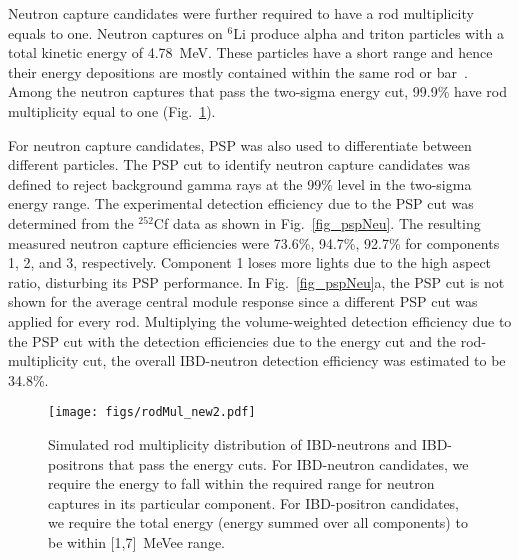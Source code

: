 \documentclass[final,5p,times,twocolumn]{elsarticle}
\begin{document}
Neutron capture candidates were further required to have a rod multiplicity equals to one.
Neutron captures on $^6$Li produce alpha and triton particles with a total kinetic energy of 4.78~MeV. These particles have a short range and hence their energy depositions are mostly contained within the same rod or bar~\cite{SANDD1}. Among the neutron captures that pass the two-sigma energy cut, 99.9\% have rod multiplicity equal to one (Fig.~\ref{fig:gamNeuMul}).

For neutron capture candidates, PSP was also used to differentiate between different particles. The PSP cut to identify neutron capture candidates was defined to reject background gamma rays at the 99\% level in the two-sigma energy range. 
The experimental detection efficiency due to the PSP cut was determined from the $^{252}$Cf data as shown in Fig.~\ref{fig_pspNeu}. The resulting measured neutron capture efficiencies were 73.6\%, 94.7\%, 92.7\% for components 1, 2, and 3, respectively.
Component 1 loses more lights due to the high aspect ratio, disturbing its PSP performance. 
In Fig.~\ref{fig_pspNeu}a, the PSP cut is not shown for the average central module response since a different PSP cut was applied for every rod. Multiplying the volume-weighted detection efficiency due to the PSP cut with the detection efficiencies due to the energy cut and the rod-multiplicity cut, the overall IBD-neutron detection efficiency was estimated to be
34.8\%.

\begin{figure}[ht]
\centering\texttt{[image: figs/rodMul\_new2.pdf]}
\caption{Simulated rod multiplicity distribution of IBD-neutrons and IBD-positrons that pass the energy cuts. For IBD-neutron candidates, we require the energy to fall within the required range for neutron captures in its particular component. For IBD-positron candidates, we require the total energy (energy summed over all components) to be within [1,7]~MeVee range.}
\label{fig:gamNeuMul}
\end{figure}
\end{document}
